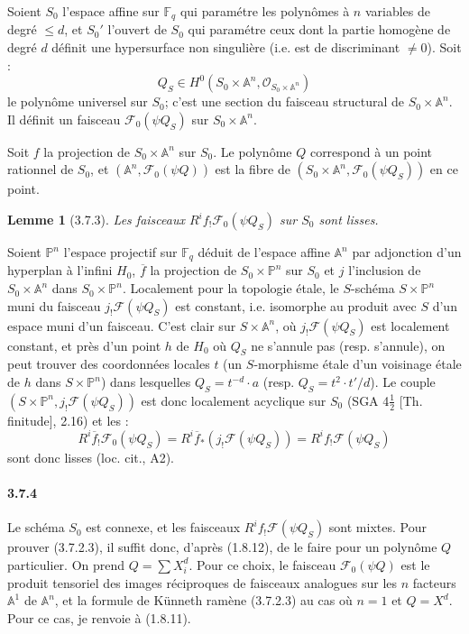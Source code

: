 \documentclass[12pt,a4paper]{article}
\theoremstyle{plain}
\newtheorem{lemma}[theorem]{Lemme}
\theoremstyle{definition}
\theoremstyle{remark}
\newcommand{\FF}{{\mathbb{F}}}
\newcommand{\PP}{{\mathbb{P}}}
\renewcommand{\AA}{\ensuremath{\mathbb{A}}}
\begin{document}
Soient $S_0$ l'espace affine sur $\FF_q$ qui param\'etre les polyn\^omes \`a $n$ variables de degr\'e $\leq d$, et $S_0'$ l'ouvert de $S_0$ qui param\'etre ceux dont la partie homog\`ene de degr\'e $d$ d\'efinit une hypersurface non singuli\`ere (i.e. est de discriminant $\neq 0$). Soit :
\[ Q_S \in H^0(S_0 \times \AA^n, \mathcal{O}_{S_0 \times \AA^n}) \]
le polyn\^ome universel sur $S_0$; c'est une section du faisceau structural de $S_0 \times \AA^n$. Il d\'efinit un faisceau $\mathscr{F}_0(\psi Q_S)$ sur $S_0 \times \AA^n$.

Soit $f$ la projection de $S_0 \times \AA^n$ sur $S_0$. Le polyn\^ome $Q$ correspond \`a un point rationnel de $S_0$, et $(\AA^n, \mathscr{F}_0(\psi Q))$ est la fibre de $(S_0 \times \AA^n, \mathscr{F}_0(\psi Q_S))$ en ce point.


\begin{lemma}[3.7.3]
Les faisceaux $R^i f_! \mathscr{F}_0(\psi Q_S)$ sur $S_0$ sont lisses.
\end{lemma}

Soient $\PP^n$ l'espace projectif sur $\FF_q$ d\'eduit de l'espace affine $\AA^n$ par adjonction d'un hyperplan \`a l'infini $H_0$, $\overline{f}$ la projection de $S_0 \times \PP^n$ sur $S_0$ et $j$ l'inclusion de $S_0 \times \AA^n$ dans $S_0 \times \PP^n$. Localement pour la topologie \'etale, le $S$-sch\'ema $S \times \PP^n$ muni du faisceau $j_! \mathscr{F}(\psi Q_S)$ est constant, i.e. isomorphe au produit avec $S$ d'un espace muni d'un faisceau. C'est clair sur $S \times \AA^n$, o\`u $j_! \mathscr{F}(\psi Q_S)$ est localement constant, et pr\`es d'un point $h$ de $H_0$ o\`u $Q_S$ ne s'annule pas (resp. s'annule), on peut trouver des coordonn\'ees locales $t$ (un $S$-morphisme \'etale d'un voisinage \'etale de $h$ dans $S \times \PP^n$) dans lesquelles $Q_S = t^{-d} \cdot a$ (resp. $Q_S = t^2 \cdot t'/d$). Le couple $(S \times \PP^n, j_! \mathscr{F}(\psi Q_S))$ est donc localement acyclique sur $S_0$ (SGA 4$\frac{1}{2}$ [Th. finitude], 2.16) et les :
\[ R^i \overline{f}_! \mathscr{F}_0(\psi Q_S) = R^i \overline{f}_* (j_! \mathscr{F}(\psi Q_S)) = R^i f_! \mathscr{F}(\psi Q_S) \]
sont donc lisses (loc. cit., A2).

\paragraph{3.7.4}
Le sch\'ema $S_0$ est connexe, et les faisceaux $R^i f_! \mathscr{F}(\psi Q_S)$ sont mixtes. Pour prouver (3.7.2.3), il suffit donc, d'apr\`es (1.8.12), de le faire pour un polyn\^ome $Q$ particulier. On prend $Q = \sum X_i^d$. Pour ce choix, le faisceau $\mathscr{F}_0(\psi Q)$ est le produit tensoriel des images r\'eciproques de faisceaux analogues sur les $n$ facteurs $\AA^1$ de $\AA^n$, et la formule de K\"unneth ram\`ene (3.7.2.3) au cas o\`u $n = 1$ et $Q = X^d$. Pour ce cas, je renvoie \`a (1.8.11).
\end{document}
